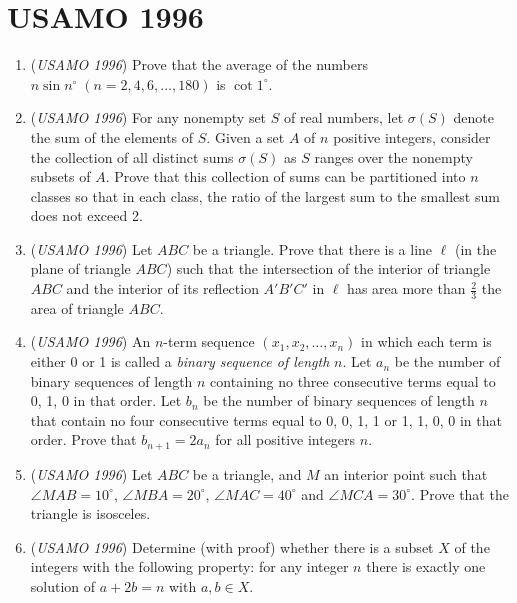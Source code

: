 \section{USAMO 1996}
        \begin{enumerate}
        	\item (\textit{USAMO 1996}) Prove that the average of the numbers $n \sin n^{\circ} \; (n = 2,4,6,\ldots,180)$ is $\cot 1^{\circ}$.


 

	\item (\textit{USAMO 1996}) For any nonempty set $S$ of real numbers, let $\sigma(S)$ denote the sum of the elements of $S$. Given a set $A$ of $n$ positive integers, consider the collection of all distinct sums $\sigma(S)$ as $S$ ranges over the nonempty subsets of $A$.  Prove that this collection of sums can be partitioned into $n$ classes so that in each class, the ratio of the largest sum to the smallest sum does not exceed 2.


 

	\item (\textit{USAMO 1996}) Let $ABC$ be a triangle.  Prove that there is a line $\ell$ (in the plane of triangle $ABC$) such that the intersection of the interior of triangle $ABC$ and the interior of its reflection $A'B'C'$ in $\ell$ has area more than $\frac23$ the area of triangle $ABC$.


 

	\item (\textit{USAMO 1996}) An $n$-term sequence $(x_1, x_2, \ldots, x_n)$ in which each term is either 0 or 1 is called a \textit{binary sequence of length} $n$.  Let $a_n$ be the number of binary sequences of length $n$ containing no three consecutive terms equal to 0, 1, 0 in that order.  Let $b_n$ be the number of binary sequences of length $n$ that contain no four consecutive terms equal to 0, 0, 1, 1 or 1, 1, 0, 0 in that order. Prove that $b_{n+1} = 2a_n$ for all positive integers $n$.


 

	\item (\textit{USAMO 1996}) Let $ABC$ be a triangle, and $M$ an interior point such that $\angle MAB=10^\circ$, $\angle MBA=20^\circ$, $\angle MAC=40^\circ$ and $\angle MCA=30^\circ$. Prove that the triangle is isosceles.


 

	\item (\textit{USAMO 1996}) Determine (with proof) whether there is a subset $X$ of the integers with the following property: for any integer $n$ there is exactly one solution of $a + 2b = n$ with $a,b \in X$.


 

\end{enumerate}
